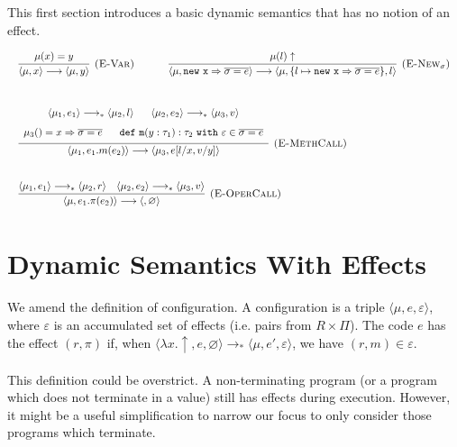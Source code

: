 \documentclass{llncs}
\newcommand{\keywadj}[1]{\mathtt{#1}}
\newcommand{\keyw}[1]{\keywadj{#1}~}
\newcommand{\config}[1] { \langle #1 \rangle }
\begin{document}
This first section introduces a basic dynamic semantics that has no notion of an effect.
\\

\fbox{$\config{\mu, e, \varepsilon} \simeq \config{\mu, e, \varepsilon}$}

\[
\begin{array}{lll}
\begin{array}{lllr}
	\infer[\textsc{(E-Var)}]
		{\config{\mu, x} \longrightarrow \config{\mu, y}}
		{\mu(x) = y}
~~~~~~~~~~
	\infer[\textsc{(E-New$_\sigma$)}]
		{\config{\mu, \keywadj{new~x} \Rightarrow \overline{\sigma = e}} \longrightarrow \config{\mu, \{ l \mapsto \keywadj{new~x} \Rightarrow \overline{\sigma = e} \}, l }}
		{\mu(l) \uparrow} \\[5ex]
		
	\infer[\textsc{(E-MethCall)}]
		{\config{\mu_1, e_1.m(e_2)} \longrightarrow \config{\mu_3, e[l/x, v/y]}}
  		{\def\arraystretch{1.6}
  			\begin{array}{c}
  				\config{\mu_1, e_1} \longrightarrow_* \config{\mu_2, l} ~~~~~
  		        \config{\mu_2, e_2} \longrightarrow_* \config{\mu_3, v} \\
  		        \mu_3() = x \Rightarrow \overline{\sigma = e} ~~~~~
			    \keywadj{def~m}(y: \tau_1) : \tau_2~\keyw{with} \varepsilon \in \overline {\sigma = e}
			\end{array} }\\[5ex]
			
	\infer[\textsc{(E-OperCall)}]
		{\config{\mu, e_1.\pi(e_2)} \longrightarrow \config{, \varnothing}}
		{\config{\mu_1, e_1} \longrightarrow_* \config{\mu_2, r} & \config{\mu_2, e_2} \longrightarrow_* \config{\mu_3, v} }
			
\end{array}
\end{array}
\]

\section{Dynamic Semantics With Effects}

We amend the definition of configuration. A configuration is a triple $\config{\mu, e, \varepsilon}$, where $\varepsilon$ is an accumulated set of effects (i.e. pairs from $R \times \Pi$). The code $e$ has the effect $(r,\pi)$ if, when $\config{\lambda x . \uparrow, e, \varnothing} \longrightarrow_* \config{\mu, e', \varepsilon}$, we have $(r,m) \in \varepsilon$.
\\\\
This definition could be overstrict. A non-terminating program (or a program which does not terminate in a value) still has effects during execution. However, it might be a useful simplification to narrow our focus to only consider those programs which terminate.
\\
\end{document}
